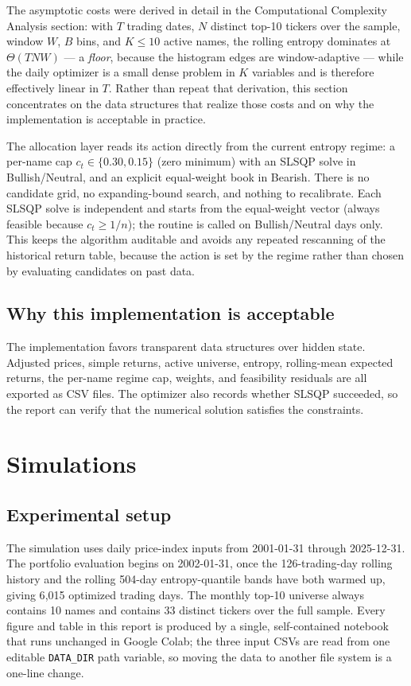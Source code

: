 \documentclass[a4paper,12pt]{article}
\begin{document}
The asymptotic costs were derived in detail in the Computational Complexity Analysis section: with $T$ trading dates, $N$ distinct top-10 tickers over the sample, window $W$, $B$ bins, and $K\le 10$ active names, the rolling entropy dominates at $\Theta(TNW)$ --- a \emph{floor}, because the histogram edges are window-adaptive --- while the daily optimizer is a small dense problem in $K$ variables and is therefore effectively linear in $T$. Rather than repeat that derivation, this section concentrates on the data structures that realize those costs and on why the implementation is acceptable in practice.

The allocation layer reads its action directly from the current entropy regime: a per-name cap $c_t\in\{0.30,0.15\}$ (zero minimum) with an SLSQP solve in Bullish/Neutral, and an explicit equal-weight book in Bearish. There is no candidate grid, no expanding-bound search, and nothing to recalibrate. Each SLSQP solve is independent and starts from the equal-weight vector (always feasible because $c_t\ge 1/n$); the routine is called on Bullish/Neutral days only. This keeps the algorithm auditable and avoids any repeated rescanning of the historical return table, because the action is set by the regime rather than chosen by evaluating candidates on past data.

\subsection{Why this implementation is acceptable}

The implementation favors transparent data structures over hidden state. Adjusted prices, simple returns, active universe, entropy, rolling-mean expected returns, the per-name regime cap, weights, and feasibility residuals are all exported as CSV files. The optimizer also records whether SLSQP succeeded, so the report can verify that the numerical solution satisfies the constraints.

\section{Simulations}
\label{sec:simulations}

\subsection{Experimental setup}

The simulation uses daily price-index inputs from 2001-01-31 through 2025-12-31. The portfolio evaluation begins on 2002-01-31, once the 126-trading-day rolling history and the rolling 504-day entropy-quantile bands have both warmed up, giving 6{,}015 optimized trading days. The monthly top-10 universe always contains 10 names and contains 33 distinct tickers over the full sample. Every figure and table in this report is produced by a single, self-contained notebook that runs unchanged in Google Colab; the three input CSVs are read from one editable \texttt{DATA\_DIR} path variable, so moving the data to another file system is a one-line change.
\end{document}
